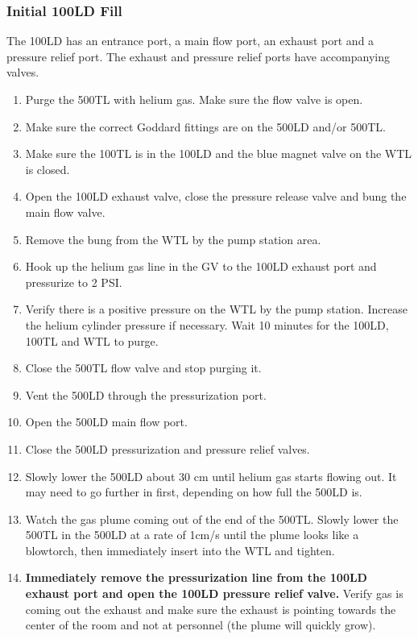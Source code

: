 \subsubsection{Initial 100LD Fill}

The 100LD has an entrance port, a main flow port, an exhaust port and a pressure relief port.  The exhaust and pressure relief ports have accompanying valves.

\begin{enumerate}
 \item Purge the 500TL with helium gas.  Make sure the flow valve is open.
 \item Make sure the correct Goddard fittings are on the 500LD and/or 500TL.
 \item Make sure the 100TL is in the 100LD and the blue magnet valve on the WTL is closed.
 \item Open the 100LD exhaust valve, close the pressure release valve and bung the main flow valve.
 \item Remove the bung from the WTL by the pump station area.
 \item Hook up the helium gas line in the GV to the 100LD exhaust port and pressurize to 2 PSI.
 \item Verify there is a positive pressure on the WTL by the pump station.  Increase the helium cylinder pressure if necessary.  Wait 10 minutes for the 100LD, 100TL and WTL to purge.
 \item Close the 500TL flow valve and stop purging it.
 \item Vent the 500LD through the pressurization port.
 \item Open the 500LD main flow port.
 \item Close the 500LD pressurization and pressure relief valves.
 \item Slowly lower the 500LD about 30 cm until helium gas starts flowing out.  It may need to go further in first, depending on how full the 500LD is.
 \item Watch the gas plume coming out of the end of the 500TL.  Slowly lower the 500TL in the 500LD at a rate of 1cm/s until the plume looks like a blowtorch, then immediately insert into the WTL and tighten.
 \item \textbf{Immediately remove the pressurization line from the 100LD exhaust port and open the 100LD pressure relief valve.} Verify gas is coming out the exhaust and make sure the exhaust is pointing towards the center of the room and not at personnel (the plume will quickly grow).

\end{enumerate}
